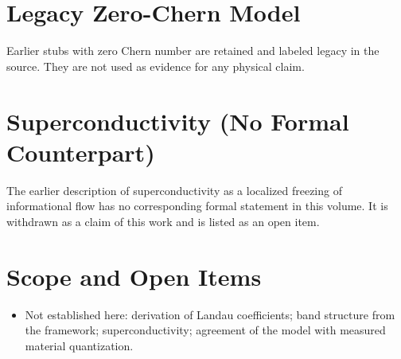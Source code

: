 \documentclass[11pt, a4paper]{article}
\begin{document}
\section{Legacy Zero-Chern Model}
Earlier stubs with zero Chern number are retained and labeled legacy in the source. They are not used as evidence for any physical claim.

\section{Superconductivity (No Formal Counterpart)}
The earlier description of superconductivity as a localized freezing of informational flow has no corresponding formal statement in this volume. It is withdrawn as a claim of this work and is listed as an open item.

\section{Scope and Open Items}
\begin{itemize}
  \item Not established here: derivation of Landau coefficients; band structure from the framework; superconductivity; agreement of the model with measured material quantization.
\end{itemize}
\end{document}
